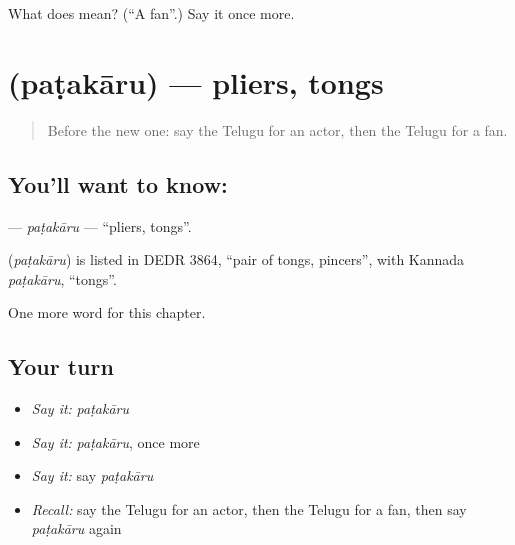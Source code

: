 \begin{tcolorbox}[breakable,colback=teal!4,colframe=teal!35!black,title={Before you move on}]
What does  mean? (\textquotedblleft{}A fan\textquotedblright{}.) Say it once more.
\end{tcolorbox}
\section[\texorpdfstring{\te{పటకారు} (paṭakāru)}{పటకారు (paṭakāru)}]{ (paṭakāru) — pliers, tongs}

\label{lesson:TE-C231-patakaru}



\begin{quote}
Before the new one: say the Telugu for an actor, then the Telugu for a fan.
\end{quote}

\subsection*{You'll want to know: }
\textbf{} — \emph{paṭakāru} — \textquotedblleft{}pliers, tongs\textquotedblright{}.

\begin{cousinweb}
\textbf{} (\emph{paṭakāru}) is listed in DEDR 3864, \textquotedblleft{}pair of tongs, pincers\textquotedblright{}, with Kannada \emph{paṭakāru}, \textquotedblleft{}tongs\textquotedblright{}.
\end{cousinweb}

\begin{grammarlens}[title={What you've built}]
One more word for this chapter.
\end{grammarlens}

\subsection*{Your turn}
\begin{itemize}
\raggedright
  \item \emph{Say it:} \emph{paṭakāru}
  \item \emph{Say it:} \emph{paṭakāru}, once more
  \item \emph{Say it:} say \emph{paṭakāru}
  \item \emph{Recall:} say the Telugu for an actor, then the Telugu for a fan, then say \emph{paṭakāru} again
\end{itemize}

